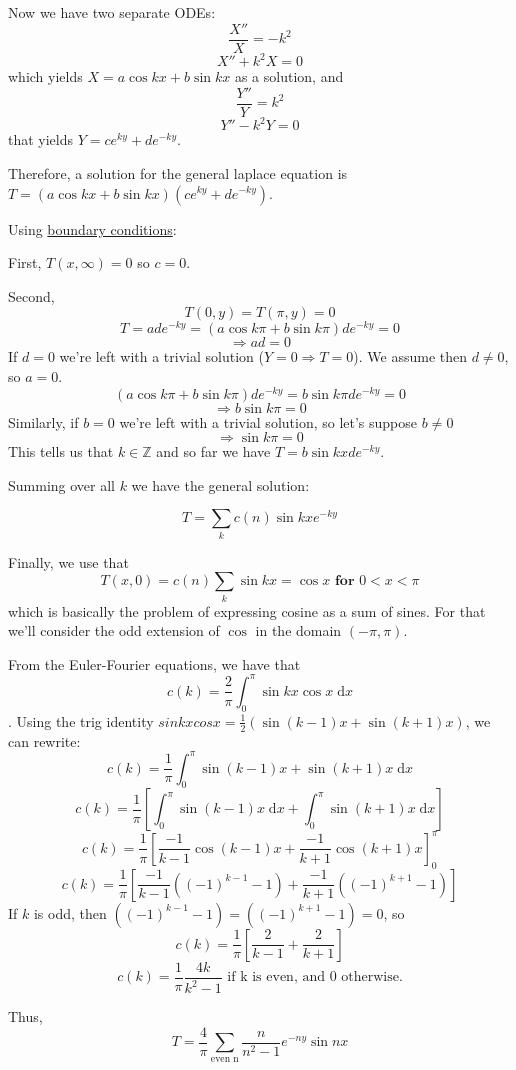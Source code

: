 \documentclass[answers]{exam}\newcommand{\repositoryInformationSetup}{     \usepackage[dvipsnames]{xcolor}     \usepackage[ angle=90, color=black, opacity=1, scale=2, ]{background}      \SetBgPosition{current page.west}      \SetBgVshift{-4.5mm}      \backgroundsetup{contents={{\color{green}\texttt{-{}-} differs from commit \texttt{f3526e2} in 0 files}}} } \newcommand{\commit}{{{\color{green}f3526e2}}}\usepackage{amsmath}
\newcommand{\Integers}{\mathbb{Z}\xspace}
\newcommand{\integers}{\Integers}
\providecommand{\id}{}
\renewcommand{\id}[1]{\ensuremath{\; \mathrm{d}#1}}
\begin{document}
\begin{questions}
\begin{solution}
		Now we have two separate ODEs:
		$$ \frac{X''}{X} = -k^2 $$
		$$ X'' + k^2X= 0 $$
		which yields $X = a\cos kx + b\sin kx$ as a solution, and
		$$\frac{Y''}{Y} = k^2$$
		$$ Y'' - k^2Y = 0$$
		that yields $Y = ce^{ky}+de^{-ky}$.

		Therefore, a solution for the general laplace equation is $T=(a\cos kx + b\sin kx)(ce^{ky}+de^{-ky})$.

		Using \underline{boundary conditions}:

		First, $ T(x,\infty) = 0$ so $c=0$.

		Second, 
		$$ T(0,y) = T(\pi,y) = 0 $$
		$$ T=ade^{-ky} = (a\cos k\pi + b\sin k\pi)de^{-ky} = 0$$
		$$ \Rightarrow ad = 0 $$
		If $d=0$ we're left with a trivial solution ($Y=0 \Rightarrow T=0$). We assume then $d\neq 0$, so $a=0$. 
		$$ (a\cos k\pi + b\sin k\pi)de^{-ky} = b\sin k\pi de^{-ky} = 0$$
		$$ \Rightarrow b\sin k\pi = 0$$
		Similarly, if $b=0$ we're left with a trivial solution, so let's suppose $b\neq 0$
		$$ \Rightarrow \sin k\pi = 0$$
		This tells us that $k \in \integers$ and so far we have $T=b\sin kx de^{-ky}$.

		Summing over all $k$ we have the general solution: 

		$$ T = \sum_{k} c(n) \sin kx e^{-ky} $$

		Finally, we use that
		$$ T(x,0) = c(n) \sum_{k} \sin kx  = \cos x \textbf{ for } 0<x<\pi$$
		which is basically the problem of expressing cosine as a sum of sines. For that we'll consider the odd extension of $\cos$ in the domain $(-\pi,\pi)$.

		From the Euler-Fourier equations, we have that
		$$ c(k) = \frac{2}{\pi} \int_{0}^\pi \sin kx \cos x \id{x}$$.
		Using the trig identity $ sin kx cos x = \frac{1}{2} (\sin(k-1)x+\sin(k+1)x)$, we can rewrite:
		$$ c(k) = \frac{1}{\pi} \int_{0}^\pi \sin(k-1)x+\sin(k+1)x \id{x}$$
		$$ c(k) = \frac{1}{\pi} \left[\int_{0}^\pi \sin(k-1)x \id{x} + \int_{0}^\pi \sin(k+1)x \id{x} \right] $$
		$$ c(k) = \frac{1}{\pi}  \left[\frac{-1}{k-1} \cos(k-1)x + \frac{-1}{k+1} \cos(k+1)x  \right]_0^\pi $$
		$$ c(k) = \frac{1}{\pi}  \left[\frac{-1}{k-1} ((-1)^{k-1}-1) + \frac{-1}{k+1} ((-1)^{k+1}-1) \right] $$
		If $k$ is odd, then $((-1)^{k-1}-1) = ((-1)^{k+1}-1) = 0$, so
		$$ c(k) = \frac{1}{\pi}  \left[\frac{2}{k-1}  + \frac{2}{k+1} \right]$$
		$$ c(k) = \frac{1}{\pi} \frac{4k}{k^2-1} \text{  if k is even, and 0 otherwise.} $$

		Thus,
		$$ T = \frac{4}{\pi} \sum_{\text{even n}} \frac{n}{n^2-1} e^{-ny} \sin nx   $$





\end{solution}
\end{questions}
\end{document}
